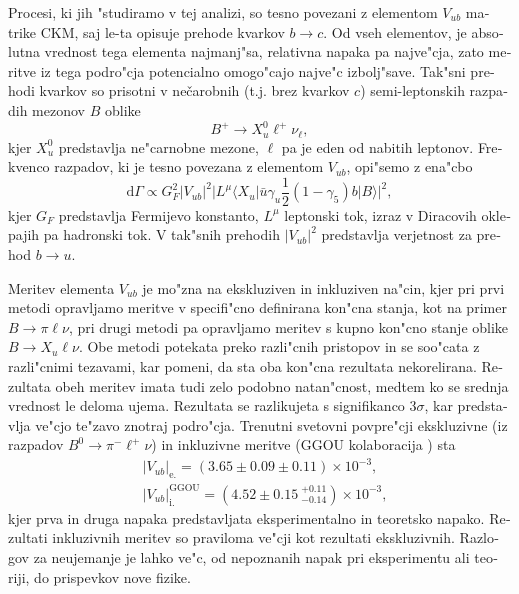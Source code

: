 \documentclass[headings=standardclasses,headings=big,oneside,a4paper,openany,12pt]{scrbook}
\newcommand {\E}[1]{\times 10^{#1}}
\begin{document}
\begin{otherlanguage}{slovene}
Procesi, ki jih "studiramo v tej analizi, so tesno povezani z elementom $V_{ub}$ matrike CKM, saj le-ta opisuje prehode kvarkov $b \to c$. Od vseh elementov, je absolutna vrednost tega elementa najmanj"sa, relativna napaka pa najve"cja, zato meritve iz tega podro"cja potencialno omogo"cajo najve"c izbolj"save. Tak"sni prehodi kvarkov so prisotni v nečarobnih (t.j. brez kvarkov $c$) semi-leptonskih razpadih mezonov $B$ oblike 
\begin{equation}
B^+ \to X_u^0 \ell^+ \nu_\ell,
\end{equation}
kjer $X_u^0$ predstavlja ne"carnobne mezone, $\ell$ pa je eden od nabitih leptonov. Frekvenco razpadov, ki je tesno povezana z elementom $V_{ub}$, opi"semo z ena"cbo
\begin{equation}
\mathrm{d} \Gamma \propto G_F^2 \vert V_{ub} \vert ^2 \vert L^\mu \langle X_u \vert \bar u \gamma_u \frac{1}{2} (1-\gamma_5) b \vert B \rangle \vert ^2,
\end{equation}
kjer $G_F$ predstavlja Fermijevo konstanto, $L^\mu$ leptonski tok, izraz v Diracovih oklepajih pa hadronski tok. V tak"snih prehodih $\vert V_{ub} \vert ^2$ predstavlja verjetnost za prehod $b \to u$.

Meritev elementa $V_{ub}$ je mo"zna na ekskluziven in inkluziven na"cin, kjer pri prvi metodi opravljamo meritve v specifi"cno definirana kon"cna stanja, kot na primer $B \to \pi \ell \nu$, pri drugi metodi pa opravljamo meritev s kupno kon"cno stanje oblike $B \to X_u \ell \nu$. Obe metodi potekata preko razli"cnih pristopov in se soo"cata z razli"cnimi tezavami, kar pomeni, da sta oba kon"cna rezultata nekorelirana. Rezultata obeh meritev imata tudi zelo podobno natan"cnost, medtem ko se srednja vrednost le deloma ujema. Rezultata se razlikujeta s signifikanco $3\sigma$, kar predstavlja ve"cjo te"zavo znotraj podro"cja. Trenutni svetovni povpre"cji \cite{Amhis:2016xyh} ekskluzivne (iz razpadov $B^0 \to \pi^- \ell^+ \nu$) in inkluzivne meritve (GGOU kolaboracija \cite{Gambino:2007rp}) sta
\begin{align}
&\vert V_{ub} \vert_{\mathrm{e.}} = \left(3.65 \pm 0.09 \pm 0.11\right)\E{-3},\\
&\vert V_{ub} \vert_{\mathrm{i.}}^{\mathrm{GGOU}} = \left(4.52 \pm 0.15~{}^{+0.11}_{-0.14}\right)\E{-3},
\end{align}
kjer prva in druga napaka predstavljata eksperimentalno in teoretsko napako. Rezultati inkluzivnih meritev so praviloma ve"cji kot rezultati ekskluzivnih. Razlogov za neujemanje je lahko ve"c, od nepoznanih napak pri eksperimentu ali teoriji, do prispevkov nove fizike.


\end{otherlanguage}
\end{document}
